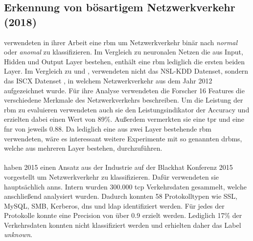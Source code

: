 \documentclass[
    12pt, %
    DIV10,
    ngerman, %
    a4paper, %
    oneside, %
    titlepage, %
    parskip=half, %
    headings=normal, %
    listof=totoc, %
    bibliography=totoc, %
    index=totoc, %
    captions=tableheading, %
    final %
]{scrreprt}
\begin{document}
\subsection{Erkennung von bösartigem Netzwerkverkehr (2018)}\label{iscx1}
\textcite{Aldwairi2018} verwendeten in ihrer Arbeit eine \ac{rbm} um Netzwerkverkehr binär nach \emph{normal} oder \emph{anomal} zu klassifizieren. Im Vergleich zu neuronalen Netzen die aus Input, Hidden und Output Layer bestehen, enthält eine \ac{rbm} lediglich die ersten beiden Layer. Im Vergleich zu \textcite{Yin2017} und \textcite{Ding2018}, verwendeten \textcite{Aldwairi2018} nicht das NSL-KDD Datenset, sondern das ISCX Datenset \parencite{shiravi2012toward}, in welchem Netzwerkverkehr aus dem Jahr 2012 aufgezeichnet wurde. Für ihre Analyse verwendeten die Forscher 16 Features die verschiedene Merkmale des Netzwerkverkehrs beschreiben. Um die Leistung der \ac{rbm} zu evaluieren verwendeten auch sie den Leistungsindikator der Accuracy und erzielten dabei einen Wert von 89\%. Au{\ss}erdem vermerkten sie eine \ac{tpr} und eine \ac{fnr} von jeweils 0.88. Da \textcite{Aldwairi2018} lediglich eine aus zwei Layer bestehende \ac{rbm} verwendeten, wäre es interessant weitere Experimente mit so genannten \ac{drbms}, welche aus mehreren Layer bestehen, durchzuführen.
\\\\
\textcite{Wang2015} haben 2015 einen Ansatz aus der Industrie auf der Blackhat Konferenz 2015 vorgestellt um Netzwerkverkehr zu klassifizieren. Dafür verwendeten sie hauptsächlich \ac{anns}. Intern wurden 300.000 \ac{tcp} Verkehrsdaten gesammelt, welche anschlie{\ss}end analysiert wurden. Dadurch konnten 58 Protokolltypen wie SSL, MySQL, SMB, Kerberos, \ac{dns} und \ac{ldap} identifiziert werden. Für jedes der Protokolle konnte eine Precision von über 0.9 erzielt werden. Lediglich 17\% der Verkehrsdaten konnten nicht klassifiziert werden und erhielten daher das Label \emph{unknown}.

%
\end{document}
